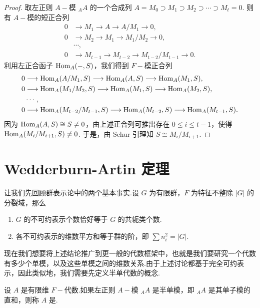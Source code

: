 \begin{proof}
取左正则 $A-\!\!$模 ${}_A A$ 的一个合成列 $A = M_0 \supset M_1 \supset M_2 \supset \cdots \supset M_t = 0$.
则有 $A-\!\!$模的短正合列
\begin{align*}
0 &\longrightarrow M_1 \longrightarrow A \longrightarrow A/M_1 \longrightarrow 0, \\
0 &\longrightarrow M_2 \longrightarrow M_1 \longrightarrow M_1/M_2 \longrightarrow 0, \\
&\cdots, \\
0 &\longrightarrow M_{t-1} \longrightarrow M_{t-2} \longrightarrow M_{t-2}/M_{t-1} \longrightarrow 0.
\end{align*}
利用左正合函子 $\operatorname{Hom}_A(-, S)$，我们得到 $F-\!\!$模正合列
\begin{align*}
0 &\longrightarrow \operatorname{Hom}_A(A/M_1, S) \longrightarrow \operatorname{Hom}_A(A, S) \longrightarrow \operatorname{Hom}_A(M_1, S), \\
0 &\longrightarrow \operatorname{Hom}_A(M_1/M_2, S) \longrightarrow \operatorname{Hom}_A(M_1, S) \longrightarrow \operatorname{Hom}_A(M_2, S), \\
&\cdots, \\
0 &\longrightarrow \operatorname{Hom}_A(M_{t-2}/M_{t-1}, S) \longrightarrow \operatorname{Hom}_A(M_{t-2}, S) \longrightarrow \operatorname{Hom}_A(M_{t-1}, S).
\end{align*}
因为 $\operatorname{Hom}_A(A, S) \cong S \neq 0$，由上述正合列可推出存在 $0 \leq i \leq t-1$，使得 $\operatorname{Hom}_A(M_i/M_{i+1}, S) \neq 0$. 于是，由 Schur 引理知 $S \cong M_i/M_{i+1}$.
\end{proof}

\section{Wedderburn-Artin 定理}


让我们先回顾群表示论中的两个基本事实.设 $G$ 为有限群，$F$ 为特征不整除 $|G|$ 的分裂域，那么
\begin{enumerate}[(1)]
    \item $G$ 的不可约表示个数恰好等于 $G$ 的共轭类个数.
    \item 各不可约表示的维数平方和等于群的阶，即 $\sum n_i^2 = |G|$.
\end{enumerate}
现在我们想要将上述结论推广到更一般的代数框架中，也就是我们要研究一个代数有多少个单模，以及这些单模之间的维数关系.由于上述讨论都基于完全可约表示，因此类似地，我们需要先定义半单代数的概念.


\begin{definition}[半单代数]
设 $A$ 是有限维 $F-\!\!$代数.如果左正则 $A-\!\!$模 ${}_A A$ 是半单模，即 ${}_A A$ 是其单子模的直和，则称 $A$ 是.
\end{definition}

